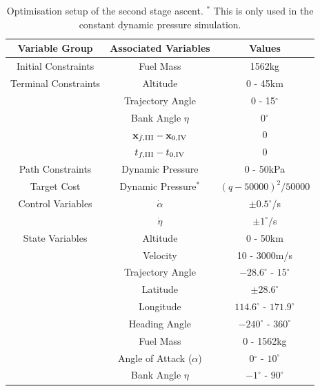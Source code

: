 \begin{table}[ht]
	\centering
\begin{tabular}{|c|c|c|}
	\hline \textbf{Variable Group}  & \textbf{Associated Variables} & \textbf{Values}\\
	\hline Initial Constraints  & Fuel Mass & 1562kg\\ 
	\hline Terminal Constraints & Altitude & 0 - 45km\\ & Trajectory Angle& 0 - 15$^\circ$\\  & Bank Angle $\eta$& 0$^\circ$\\  & $\textbf{x}_{f,\textrm{\rom{3}}} - \textbf{x}_{0,\textrm{\rom{4}}}$ & 0\\ & $t_{f,\textrm{\rom{3}}} - t_{0,\textrm{\rom{4}}}$ & 0\\
	\hline Path Constraints & Dynamic Pressure& 0 - 50kPa\\ 
	\hline Target Cost & Dynamic Pressure$^*$ & $(q-50000)^2/50000$\\ 
			\hline Control Variables & $\dot{\alpha}$ &  $\pm0.5^\circ$/s\\  & $\dot{\eta}$ &  $\pm1^\circ$/s\\ 
			\hline State Variables & Altitude & 0 - 50km\\ & Velocity& 10 - 3000m/s\\ & Trajectory Angle& $-28.6^\circ$ - $15^\circ$\\   & Latitude&$\pm28.6^\circ$ \\  & Longitude& $114.6^\circ$ - $171.9^\circ$\\   & Heading Angle& $-240^\circ$ - $360^\circ$ \\  & Fuel Mass& 0 - 1562kg \\  & Angle of Attack ($\alpha$)&  0$^\circ$ - $10^\circ$ \\  & Bank Angle $\eta$& $-1^\circ$ - $90^\circ$ \\  
	\hline 
\end{tabular} 
\caption{Optimisation setup of the second stage ascent. $^*$ This is only used in the constant dynamic pressure simulation.}
\label{tab:SPARTANascentsetup}
\end{table}


